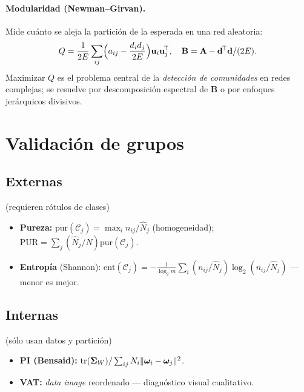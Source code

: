 \paragraph{Modularidad (Newman--Girvan).} Mide cuánto se aleja la
partición de la esperada en una red aleatoria:
\[
Q=\frac{1}{2E}\sum_{ij}\Bigl(a_{ij}-\frac{d_id_j}{2E}\Bigr)\mathbf{u}_i\mathbf{u}_j^{\!\top},
\quad \mathbf{B}=\mathbf{A}-\mathbf{d}^{\!\top}\mathbf{d}/(2E).
\]
Maximizar $Q$ es el problema central de la \emph{detección de
comunidades} en redes complejas; se resuelve por descomposición
espectral de $\mathbf{B}$ o por enfoques jerárquicos divisivos.

\section{Validación de grupos}

\subsection{Externas} (requieren rótulos de clases)
\begin{itemize}[leftmargin=1.2cm]
  \item \textbf{Pureza:}
        $\mathrm{pur}(\mathcal{C}_j)=\max_i n_{ij}/\hat N_j$
        (homogeneidad);
        $\mathrm{PUR}=\sum_j(\hat N_j/N)\mathrm{pur}(\mathcal{C}_j)$.
  \item \textbf{Entropía} (Shannon):
        $\mathrm{ent}(\mathcal{C}_j)=-\frac{1}{\log_2 m}\sum_i (n_{ij}/\hat N_j)\log_2(n_{ij}/\hat N_j)$
        --- menor es mejor.
\end{itemize}

\subsection{Internas} (sólo usan datos y partición)
\begin{itemize}[leftmargin=1.2cm]
  \item \textbf{PI (Bensaid):}
        $\operatorname{tr}(\boldsymbol\Sigma_W)/\sum_{ij}N_i\|\boldsymbol\omega_i-\boldsymbol\omega_j\|^2$.
  \item \textbf{VAT:} \emph{data image} reordenado --- diagnóstico
        visual cualitativo.
\end{itemize}

